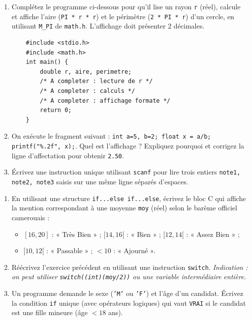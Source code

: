 \documentclass[11pt]{article}
\begin{document}
\begin{exercice}
\begin{enumerate}
    \item Complétez le programme ci-dessous pour qu'il lise un rayon \texttt{r} (réel), calcule et affiche l'aire (\texttt{PI * r * r}) et le périmètre (\texttt{2 * PI * r}) d'un cercle, en utilisant \texttt{M\_PI} de \texttt{math.h}. L'affichage doit présenter 2 décimales.
    \begin{verbatim}
    #include <stdio.h>
    #include <math.h>
    int main() {
        double r, aire, perimetre;
        /* A completer : lecture de r */
        /* A completer : calculs */
        /* A completer : affichage formate */
        return 0;
    }
    \end{verbatim}
    \item On exécute le fragment suivant : \texttt{int a=5, b=2; float x = a/b; printf("\%.2f", x);}. Quel est l'affichage ? Expliquez pourquoi et corrigez la ligne d'affectation pour obtenir \texttt{2.50}.
    \item Écrivez une instruction unique utilisant \texttt{scanf} pour lire trois entiers \texttt{note1, note2, note3} saisis sur une même ligne séparés d'espaces.
\end{enumerate}
\end{exercice}

\begin{exercice}
\begin{enumerate}
    \item En utilisant une structure \texttt{if...else if...else}, écrivez le bloc C qui affiche la mention correspondant à une moyenne \texttt{moy} (réel) selon le barème officiel camerouais :
    \begin{itemize}
        \item $[16, 20]$ : « Très Bien » ; $[14, 16[$ : « Bien » ; $[12, 14[$ : « Assez Bien » ;
        \item $[10, 12[$ : « Passable » ; $< 10$ : « Ajourné ».
    \end{itemize}
    \item Réécrivez l'exercice précédent en utilisant une instruction \texttt{switch}. \textit{Indication : on peut utiliser \texttt{switch((int)(moy/2))} ou une variable intermédiaire entière.}
    \item Un programme demande le sexe (\texttt{'M'} ou \texttt{'F'}) et l'âge d'un candidat. Écrivez la condition \texttt{if} unique (avec opérateurs logiques) qui vaut \texttt{VRAI} si le candidat est une fille mineure (âge $< 18$ ans).
\end{enumerate}
\end{exercice}
\end{document}
